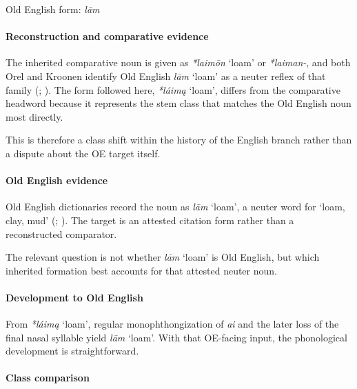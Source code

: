 \documentclass[
  british,
  a4paper,
]{article}
\providecommand{\Recon}[1]{\emph{*#1}}
\begin{document}
Old English form: \emph{lām}

\paragraph{Reconstruction and comparative
evidence}\label{reconstruction-and-comparative-evidence-95}

The inherited comparative noun is given as \Recon{laimōn} `loam' or
\emph{*laiman-}, and both Orel and Kroonen identify Old English
\emph{lām} `loam' as a neuter reflex of that family
(;
). The form followed here,
\Recon{láimą} `loam', differs from the comparative headword because it
represents the stem class that matches the Old English noun most
directly.

This is therefore a class shift within the history of the English branch
rather than a dispute about the OE target itself.

\paragraph{Old English evidence}\label{old-english-evidence-95}

Old English dictionaries record the noun as \emph{lām} `loam', a neuter
word for `loam, clay, mud' (; ). The target is an attested citation form rather than a
reconstructed comparator.

The relevant question is not whether \emph{lām} `loam' is Old English,
but which inherited formation best accounts for that attested neuter
noun.

\paragraph{Development to Old
English}\label{development-to-old-english-95}

From \Recon{láimą} `loam', regular monophthongization of \emph{ai} and
the later loss of the final nasal syllable yield \emph{lām} `loam'. With
that OE-facing input, the phonological development is straightforward.

\paragraph{Class comparison}\label{class-comparison-3}
\end{document}
